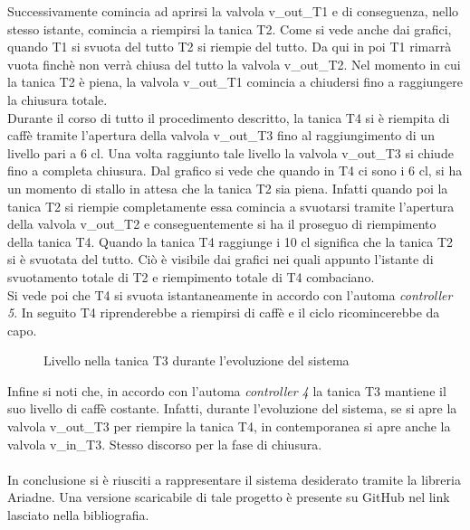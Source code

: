 \documentclass[12pt]{article}
\begin{document}
Successivamente comincia ad aprirsi la valvola v\_out\_T1 e di conseguenza, nello stesso istante, comincia a riempirsi la tanica T2. Come si vede anche dai grafici, quando T1 si svuota del tutto T2 si riempie del tutto. Da qui in poi T1 rimarrà vuota finchè non verrà chiusa del tutto la valvola v\_out\_T2.
Nel momento in cui la tanica T2 è piena, la valvola v\_out\_T1 comincia a chiudersi fino a raggiungere la chiusura totale.\\
Durante il corso di tutto il procedimento descritto, la tanica T4 si è riempita di caffè tramite l'apertura della valvola v\_out\_T3 fino al raggiungimento di un livello pari a 6 cl. Una volta raggiunto tale livello la valvola v\_out\_T3 si chiude fino a completa chiusura. Dal grafico si vede che quando in T4 ci sono i 6 cl, si ha un momento di stallo in attesa che la tanica T2 sia piena. Infatti quando poi la tanica T2 si riempie completamente essa comincia a svuotarsi tramite l'apertura della valvola v\_out\_T2 e conseguentemente si ha il proseguo di riempimento della tanica T4. Quando la tanica T4 raggiunge i 10 cl significa che la tanica T2 si è svuotata del tutto. Ciò è visibile dai grafici nei quali appunto l'istante di svuotamento totale di T2 e riempimento totale di T4 combaciano.\\
Si vede poi che T4 si svuota istantaneamente in accordo con l'automa \textit{controller 5}. In seguito T4 riprenderebbe a riempirsi di caffè e il ciclo ricomincerebbe da capo.
\begin{figure}[H]
\begin{center}
	\caption{Livello nella tanica T3 durante l'evoluzione del sistema}
\end{center}
\end{figure}
Infine si noti che, in accordo con l'automa \textit{controller 4} la tanica T3 mantiene il suo livello di caffè costante. Infatti, durante l'evoluzione del sistema, se si apre la valvola v\_out\_T3 per riempire la tanica T4, in contemporanea si apre anche la valvola v\_in\_T3. Stesso discorso per la fase di chiusura.\\\\
In conclusione si è riusciti a rappresentare il sistema desiderato tramite la libreria Ariadne. Una versione scaricabile di tale progetto è presente su GitHub nel link lasciato nella bibliografia.
\end{document}
